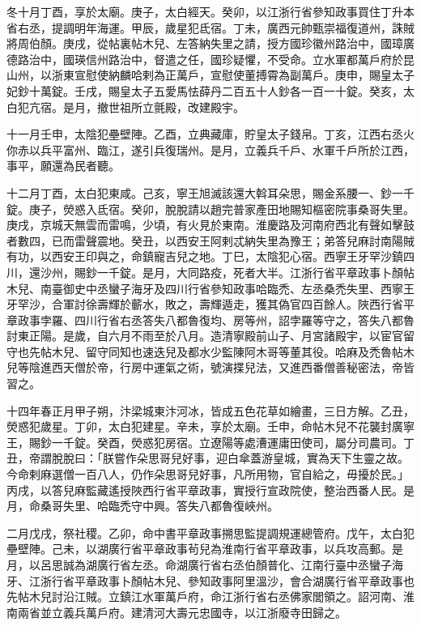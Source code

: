 \begin{pinyinscope}
 冬十月丁酉，享於太廟。庚子，太白經天。癸卯，以江浙行省參知政事買住丁升本省右丞，提調明年海運。甲辰，歲星犯氐宿。丁未，廣西元帥甄崇福復道州，誅賊將周伯顏。庚戌，從帖裏帖木兒、左答納失里之請，授方國珍徽州路治中，國璋廣德路治中，國瑛信州路治中，督遣之任，國珍疑懼，不受命。立水軍都萬戶府於昆山州，以浙東宣慰使納麟哈剌為正萬戶，宣慰使董搏霄為副萬戶。庚申，賜皇太子妃鈔十萬錠。壬戌，賜皇太子五愛馬怯薛丹二百五十人鈔各一百一十錠。癸亥，太白犯亢宿。是月，撤世祖所立氈殿，改建殿宇。



 十一月壬申，太陰犯壘壁陣。乙酉，立典藏庫，貯皇太子錢帛。丁亥，江西右丞火你赤以兵平富州、臨江，遂引兵復瑞州。是月，立義兵千戶、水軍千戶所於江西，事平，願還為民者聽。



 十二月丁酉，太白犯東咸。己亥，寧王旭滅該還大斡耳朵思，賜金系腰一、鈔一千錠。庚子，熒惑入氐宿。癸卯，脫脫請以趙完普家產田地賜知樞密院事桑哥失里。庚戌，京城天無雲而雷鳴，少頃，有火見於東南。淮慶路及河南府西北有聲如擊鼓者數四，已而雷聲震地。癸丑，以西安王阿剌忒納失里為豫王；弟答兒麻討南陽賊有功，以西安王印與之，命鎮寵吉兒之地。丁巳，太陰犯心宿。西寧王牙罕沙鎮四川，還沙州，賜鈔一千錠。是月，大同路疫，死者大半。江浙行省平章政事卜顏帖木兒、南臺御史中丞蠻子海牙及四川行省參知政事哈臨禿、左丞桑禿失里、西寧王牙罕沙，合軍討徐壽輝於蘄水，敗之，壽輝遁走，獲其偽官四百餘人。陜西行省平章政事孛羅、四川行省右丞答失八都魯復均、房等州，詔孛羅等守之，答失八都魯討東正陽。是歲，自六月不雨至於八月。造清寧殿前山子、月宮諸殿宇，以宦官留守也先帖木兒、留守同知也速迭兒及都水少監陳阿木哥等董其役。哈麻及禿魯帖木兒等陰進西天僧於帝，行房中運氣之術，號演揲兒法，又進西番僧善秘密法，帝皆習之。



 十四年春正月甲子朔，汴梁城東汴河冰，皆成五色花草如繪畫，三日方解。乙丑，熒惑犯歲星。丁卯，太白犯建星。辛未，享於太廟。壬申，命帖木兒不花襲封廣寧王，賜鈔一千錠。癸酉，熒惑犯房宿。立遼陽等處漕運庸田使司，屬分司農司。丁丑，帝謂脫脫曰：「朕嘗作朵思哥兒好事，迎白傘蓋游皇城，實為天下生靈之故。今命剌麻選僧一百八人，仍作朵思哥兒好事，凡所用物，官自給之，毋擾於民。」丙戌，以答兒麻監藏遙授陜西行省平章政事，實授行宣政院使，整治西番人民。是月，命桑哥失里、哈臨禿守中興。答失八都魯復峽州。



 二月戊戌，祭社稷。乙卯，命中書平章政事搠思監提調規運總管府。戊午，太白犯壘壁陣。己未，以湖廣行省平章政事茍兒為淮南行省平章政事，以兵攻高郵。是月，以呂思誠為湖廣行省左丞。命湖廣行省右丞伯顏普化、江南行臺中丞蠻子海牙、江浙行省平章政事卜顏帖木兒、參知政事阿里溫沙，會合湖廣行省平章政事也先帖木兒討沿江賊。立鎮江水軍萬戶府，命江浙行省右丞佛家閭領之。詔河南、淮南兩省並立義兵萬戶府。建清河大壽元忠國寺，以江浙廢寺田歸之。




\end{pinyinscope}

